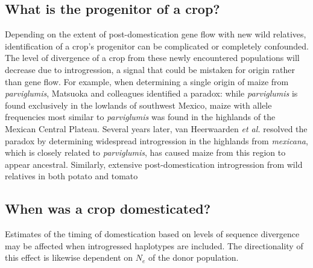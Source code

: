 \documentclass[11pt]{article}
\newcommand{\gmj}[1]{\textcolor{blue}{ \emph{\scriptsize  #1}} } %
\begin{document}
\subsection*{What is the progenitor of a crop?}
Depending on the extent of post-domestication gene flow with new wild relatives, identification of a crop's progenitor can be complicated or completely confounded.
The level of divergence of a crop from these newly encountered populations will decrease due to introgression, a signal that could be mistaken for origin rather than gene flow.
For example, when determining a single origin of maize from \emph{parviglumis}, Matsuoka and colleagues \cite{Matsuoka2002} identified a paradox: while \emph{parviglumis} is found exclusively in the lowlands of southwest Mexico, maize with allele frequencies most similar to \emph{parviglumis} was found in the highlands of the Mexican Central Plateau.
Several years later, van Heerwaarden \emph{et al.} \cite{vanHeerwaarden2011} resolved the paradox by determining widespread introgression in the highlands from \emph{mexicana}, which is closely related to \emph{parviglumis}, has caused maize from this region to appear ancestral.
Similarly, extensive post-domestication introgression from wild relatives in both potato \cite{Spooner2014} and tomato


\subsection*{When was a crop domesticated?}
Estimates of the timing of domestication based on levels of sequence divergence may be affected when introgressed haplotypes are included.
The directionality of this effect is likewise dependent on $N_e$ of the donor population.
\end{document}

